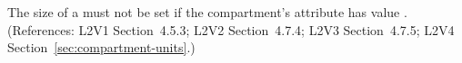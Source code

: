 The size of a \Compartment must not be set if the compartment's
 attribute has value . (References: L2V1
Section~4.5.3; L2V2 Section~4.7.4; L2V3 Section~4.7.5; L2V4 Section~\ref{sec:compartment-units}.)
